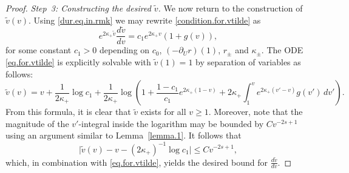 \documentclass[10pt, reqno]{amsart}
\theoremstyle{definition}
\theoremstyle{remark}
\numberwithin{equation}{section}
\newcommand{\abs}[1]{\vert#1\vert}
\newcommand{\ud}{d}
\newcommand{\rd}{\partial}
\newcommand{\0}{\emptyset}
\newcommand{\kpp}{\kappa}
\newcommand{\f}{\frac}
\newcommand{\pfstep}[1]{\vspace{.5em} {\it \noindent #1.}}
\begin{document}
\begin{proof}
\pfstep{Step~3: Constructing the desired $\widetilde{v}$} We now return to the construction of $\widetilde{v}(v)$. Using \eqref{dur.eq.in.rmk} we may rewrite \eqref{condition.for.vtilde} as
\begin{equation} \label{eq.for.vtilde}
	e^{2 \kpp_{+} \widetilde{v}} \f{\ud \widetilde{v}}{\ud v} 
	= c_{1} e^{2 \kpp_{+} v}(1 + g(v)),
\end{equation}
for some constant $c_1>0$ depending on $c_0$, $(-\rd_{U} r)(1)$, $r_{\pm}$ and $\kappa_{\pm}$. The ODE \eqref{eq.for.vtilde} is explicitly solvable with $\tilde{v}(1) = 1$ by separation of variables as follows:
\begin{equation}
	\widetilde{v}(v) = v + \frac{1}{2 \kpp_{+}} \log c_{1} + \frac{1}{2 \kpp_{+}} \log \left(1 + \frac{1 - c_{1}}{c_{1}} e^{2 \kpp_{+}(1 - v)} + 2 \kpp_{+} \int_{1}^{v} e^{2 \kpp_{+}(v' - v)} g(v') \, \ud v' \right).
\end{equation}
From this formula, it is clear that $\widetilde{v}$ exists for all $v \geq 1$. Moreover, note that the magnitude of the $v'$-integral inside the logarithm may be bounded by $C v^{-2s +1}$ using an argument similar to Lemma~\ref{lemma.1}. It follows that
\begin{equation*}
	\abs{\widetilde{v}(v) - v - (2 \kpp_{+})^{-1} \log c_{1}} \leq C v^{-2s + 1}, 
\end{equation*}
which, in combination with \eqref{eq.for.vtilde}, yields the desired bound for $\frac{\ud \widetilde{v}}{\ud v}$. \qedhere
\end{proof}
\end{document}
